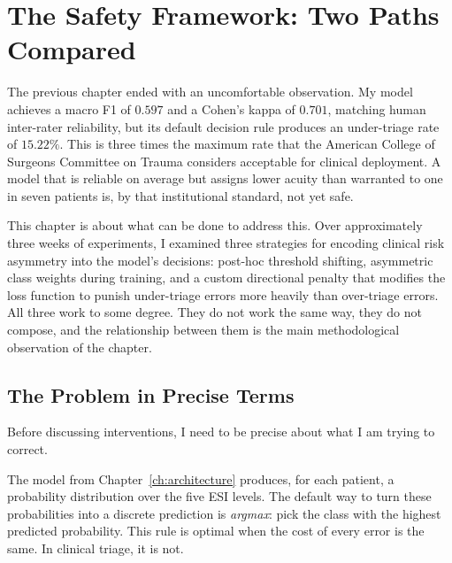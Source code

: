 
\chapter{The Safety Framework: Two Paths Compared}
\label{ch:safety}

The previous chapter ended with an uncomfortable observation. My model achieves a macro F1 of $0.597$ and a Cohen's kappa of $0.701$, matching human inter-rater reliability, but its default decision rule produces an under-triage rate of $15.22\%$. This is three times the maximum rate that the American College of Surgeons Committee on Trauma considers acceptable for clinical deployment. A model that is reliable on average but assigns lower acuity than warranted to one in seven patients is, by that institutional standard, not yet safe.

This chapter is about what can be done to address this. Over approximately three weeks of experiments, I examined three strategies for encoding clinical risk asymmetry into the model's decisions: post-hoc threshold shifting, asymmetric class weights during training, and a custom directional penalty that modifies the loss function to punish under-triage errors more heavily than over-triage errors. All three work to some degree. They do not work the same way, they do not compose, and the relationship between them is the main methodological observation of the chapter.

\section{The Problem in Precise Terms}

Before discussing interventions, I need to be precise about what I am trying to correct.

The model from Chapter~\ref{ch:architecture} produces, for each patient, a probability distribution over the five ESI levels. The default way to turn these probabilities into a discrete prediction is \emph{argmax}: pick the class with the highest predicted probability. This rule is optimal when the cost of every error is the same. In clinical triage, it is not.

